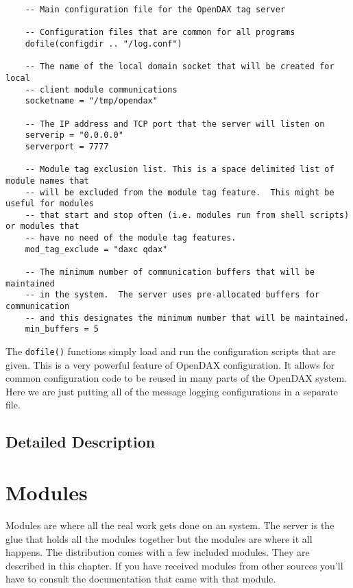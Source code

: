 	\begin{verbatim}
	-- Main configuration file for the OpenDAX tag server

	-- Configuration files that are common for all programs
	dofile(configdir .. "/log.conf")

	-- The name of the local domain socket that will be created for local
	-- client module communications
	socketname = "/tmp/opendax"

	-- The IP address and TCP port that the server will listen on
	serverip = "0.0.0.0"
	serverport = 7777

	-- Module tag exclusion list. This is a space delimited list of module names that
	-- will be excluded from the module tag feature.  This might be useful for modules
	-- that start and stop often (i.e. modules run from shell scripts) or modules that
	-- have no need of the module tag features.
	mod_tag_exclude = "daxc qdax"

	-- The minimum number of communication buffers that will be maintained
	-- in the system.  The server uses pre-allocated buffers for communication
	-- and this designates the minimum number that will be maintained.
	min_buffers = 5

	\end{verbatim}

	The \texttt{dofile()} functions simply load and run the configuration scripts
	that are given.  This is a very powerful feature of OpenDAX configuration.  It
	allows for common configuration code to be reused in many parts of the OpenDAX
	system.  Here we are just putting all of the message logging configurations in a
	separate file.

    \section{Detailed Description}



	\chapter{Modules}
	Modules are where all the real work gets done on an \opendax{} system.  The server
	is the glue that holds all the modules together but the modules are where it all
	happens.  The \opendax{} distribution comes with a few included modules.  They are
	described in this chapter.  If you have received modules from other sources
	you'll have to consult the documentation that came with that module.

